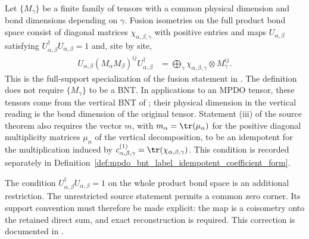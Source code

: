 \begin{definition}%
    \label{def:mpdo_bnt_fusion_isometry_family}
    \leanok
    Let $\{M_\gamma\}$ be a finite family of tensors with a common physical
    dimension and bond dimensions depending on $\gamma$. Fusion isometries
    on the full product bond space consist of diagonal matrices
    $\chi_{\alpha,\beta,\gamma}$ with positive entries and maps
    $U_{\alpha,\beta}$ satisfying
    $U_{\alpha,\beta}^\dagger U_{\alpha,\beta}=1$ and, site by site,
    \begin{align}
        U_{\alpha,\beta}(M_\alpha M_\beta)^{ij}
        U_{\alpha,\beta}^\dagger
         & =
        \bigoplus_\gamma
        \chi_{\alpha,\beta,\gamma}\otimes M_\gamma^{ij}.
        \label{eq:rfp_fusion_identity}
    \end{align}
    This is the full-support specialization of the fusion statement in
    \cite[Theorem~4.14(iii)]{Cirac2016MPDO_arXiv}. The definition does not
    require $\{M_\gamma\}$ to be a BNT. In applications to an MPDO tensor,
    these tensors come from the vertical BNT of
    \cite[Proposition~4.13]{Cirac2016MPDO_arXiv}; their physical dimension
    in the vertical reading is the bond dimension of the original tensor.
    Statement (iii) of the source theorem also requires the vector
    $m$, with $m_\alpha=\tr(\mu_\alpha)$ for the positive diagonal
    multiplicity matrices $\mu_\alpha$ of the vertical decomposition, to
    be an idempotent for the multiplication induced by
    $c_{\alpha,\beta,\gamma}^{(1)}
        =\tr(\chi_{\alpha,\beta,\gamma})$. This condition is recorded
    separately in
    Definition~\ref{def:mpdo_bnt_label_idempotent_coefficient_form}.

    The condition $U_{\alpha,\beta}^\dagger U_{\alpha,\beta}=1$ on the whole
    product bond space is an additional restriction. The unrestricted
    source statement permits a common zero corner. Its support convention
    must therefore be made explicit: the map is a coisometry onto the
    retained direct sum, and exact reconstruction is required. This
    correction is documented in
    \cite{gap:cpsv16_figure11_fusion_coisometry}.
\end{definition}

